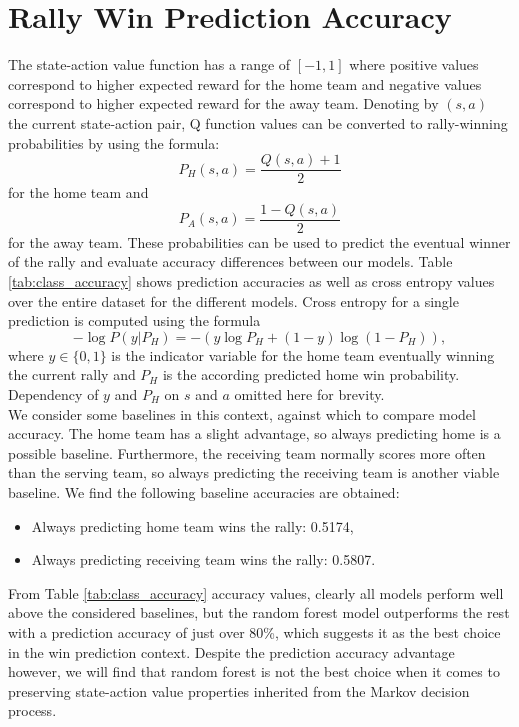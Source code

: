\documentclass{sfuthesis}
\begin{document}
	\section{Rally Win Prediction Accuracy}
	The state-action value function has a range of $[-1,1]$ where positive values correspond to higher expected reward for the home team and negative values correspond to higher expected reward for the away team. Denoting by $(s,a)$ the current state-action pair, Q function values can be converted to rally-winning probabilities by using the formula:
	\begin{equation}
		P_H(s,a) = \frac{Q(s,a)+1}{2}
		\label{eq:q_to_prob}
	\end{equation}
	for the home team and
	\begin{equation}
		P_A(s,a) = \frac{1-Q(s,a)}{2}
	\end{equation}
	for the away team. These probabilities can be used to predict the eventual winner of the rally and evaluate accuracy differences between our models. Table \ref{tab:class_accuracy} shows prediction accuracies as well as cross entropy values over the entire dataset for the different models. Cross entropy for a single prediction is computed using the formula
	\begin{equation}
		-\log P(y|P_H) = - (y \log P_H + (1-y) \log(1-P_H)),
	\end{equation}
	where $y \in \{0,1\}$ is the indicator variable for the home team eventually winning the current rally and $P_H$ is the according predicted home win probability. Dependency of $y$ and $P_H$ on $s$ and $a$ omitted here for brevity.\\
	We consider some baselines in this context, against which to compare model accuracy. The home team has a slight advantage, so always predicting home is a possible baseline. Furthermore, the receiving team normally scores more often than the serving team, so always predicting the receiving team is another viable baseline. We find the following baseline accuracies are obtained:
	\begin{itemize}
		\item Always predicting home team wins the rally: 0.5174,
		\item Always predicting receiving team wins the rally: 0.5807.
	\end{itemize}
	From Table \ref{tab:class_accuracy} accuracy values, clearly all models perform well above the considered baselines, but the random forest model outperforms the rest with a prediction accuracy of just over 80\%, which suggests it as the best choice in the win prediction context. Despite the prediction accuracy advantage however, we will find that random forest is not the best choice when it comes to preserving state-action value properties inherited from the Markov decision process.\\
\end{document}
